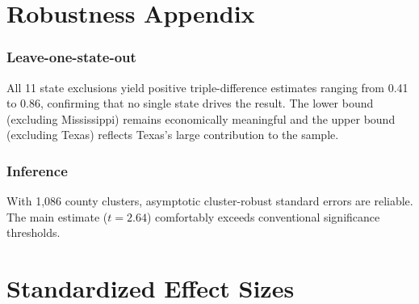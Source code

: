 \documentclass[12pt]{article}
\begin{document}
\section{Robustness Appendix}

\subsubsection*{Leave-one-state-out} All 11 state exclusions yield positive triple-difference estimates ranging from 0.41 to 0.86, confirming that no single state drives the result. The lower bound (excluding Mississippi) remains economically meaningful and the upper bound (excluding Texas) reflects Texas's large contribution to the sample.

\subsubsection*{Inference} With 1,086 county clusters, asymptotic cluster-robust standard errors are reliable. The main estimate ($t = 2.64$) comfortably exceeds conventional significance thresholds.

\section{Standardized Effect Sizes}
\label{sec:sde}


\end{document}
